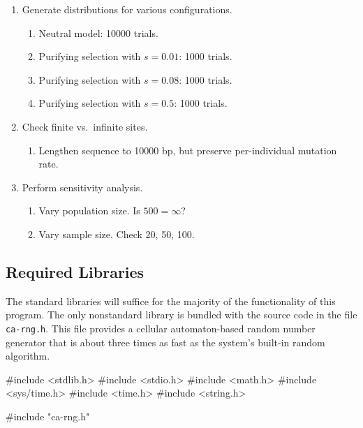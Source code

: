 \documentclass{article}
\begin{document}
        \begin{enumerate}
          \item Generate distributions for various configurations.
            \begin{enumerate}
              \item Neutral model: 10000 trials.
              \item Purifying selection with $s=0.01$: 1000 trials.
              \item Purifying selection with $s=0.08$: 1000 trials.
              \item Purifying selection with $s=0.5$: 1000 trials.
            \end{enumerate}

          \item Check finite vs.\ infinite sites.
            \begin{enumerate}
              \item Lengthen sequence to 10000 bp, but preserve per-individual
              mutation rate.
            \end{enumerate}

          \item Perform sensitivity analysis.
            \begin{enumerate}
              \item Vary population size. Is $500 = \infty$?
              \item Vary sample size. Check 20, 50, 100.
            \end{enumerate}
        \end{enumerate}

    \subsection{Required Libraries}
      \label{sec:libraries}

      The standard libraries will suffice for the majority of the functionality
      of this program. The only nonstandard library is bundled with the source
      code in the file \verb|ca-rng.h|. This file provides a cellular
      automaton-based random number generator that is about three times as fast
      as the system's built-in random algorithm.

\begin{ccode}
#include <stdlib.h>
#include <stdio.h>
#include <math.h>
#include <sys/time.h>
#include <time.h>
#include <string.h>

#include "ca-rng.h"
\end{ccode}
\end{document}
